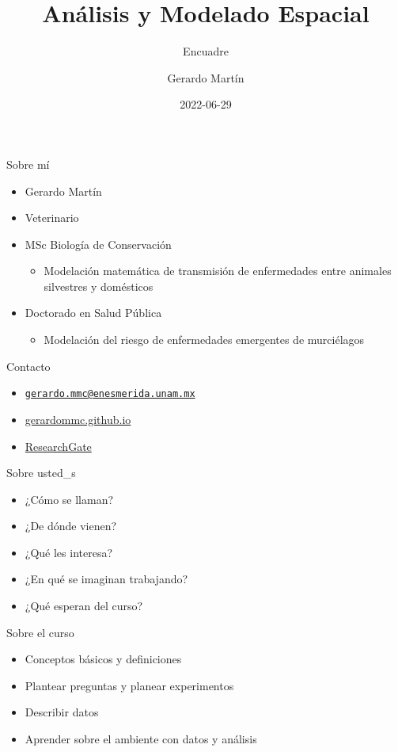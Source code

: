 \documentclass[
  11pt,
  ignorenonframetext,
]{beamer}
\title{Análisis y Modelado Espacial}
\subtitle{Encuadre}
\author{Gerardo Martín}
\date{2022-06-29}
\providecommand{\tightlist}{%
  \setlength{\itemsep}{0pt}\setlength{\parskip}{0pt}}
\begin{document}
\frame{\titlepage}

\begin{frame}{Sobre mí}
\protect\hypertarget{sobre-muxed}{}
\begin{itemize}
\item
  Gerardo Martín
\item
  Veterinario
\item
  MSc Biología de Conservación

  \begin{itemize}
  \tightlist
  \item
    Modelación matemática de transmisión de enfermedades entre animales
    silvestres y domésticos
  \end{itemize}
\item
  Doctorado en Salud Pública

  \begin{itemize}
  \tightlist
  \item
    Modelación del riesgo de enfermedades emergentes de murciélagos
  \end{itemize}
\end{itemize}
\end{frame}

\begin{frame}{Contacto}
\protect\hypertarget{contacto}{}
\begin{itemize}
\tightlist
\item
  \href{mailto:gerardo.mmc@enesmerida.unam.mx}{\nolinkurl{gerardo.mmc@enesmerida.unam.mx}}
\item
  \href{https://gerardommc.github.io}{gerardommc.github.io}
\item
  \href{https://www.researchgate.net/profile/Gerardo-Martin}{ResearchGate}
\end{itemize}
\end{frame}

\begin{frame}{Sobre usted\_s}
\protect\hypertarget{sobre-usted_s}{}
\begin{itemize}
\tightlist
\item
  ¿Cómo se llaman?
\item
  ¿De dónde vienen?
\item
  ¿Qué les interesa?
\item
  ¿En qué se imaginan trabajando?
\item
  ¿Qué esperan del curso?
\end{itemize}
\end{frame}

\begin{frame}{Sobre el curso}
\protect\hypertarget{sobre-el-curso}{}
\begin{itemize}
\tightlist
\item
  Conceptos básicos y definiciones
\item
  Plantear preguntas y planear experimentos
\item
  Describir datos
\item
  Aprender sobre el ambiente con datos y análisis
\end{itemize}
\end{frame}
\end{document}
